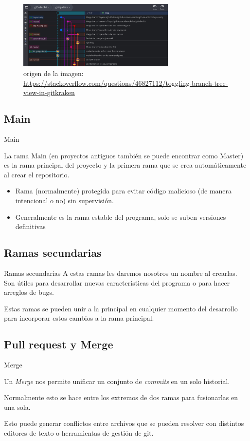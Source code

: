 \documentclass{beamer}
\begin{document}
\begin{frame}
    \begin{figure}[H]
        \includegraphics[width=0.7\textwidth]{../Images/ejemplo-ramas.png}
        \caption{origen de la imagen: \url{https://stackoverflow.com/questions/46827112/toggling-branch-tree-view-in-gitkraken}}
    \end{figure}
\end{frame}
\subsection{Main}
\begin{frame}{Main}
    
    La rama Main (en proyectos antiguos también se puede encontrar como Master) es la rama principal del proyecto y la primera rama que se crea automáticamente al crear el repositorio.

    \begin{itemize}
        \item Rama (normalmente) protegida para evitar código malicioso (de manera intencional o no) sin supervisión.
        \item Generalmente es la rama estable del programa, solo se suben versiones definitivas
    \end{itemize}

\end{frame}
\subsection{Ramas secundarias}
\begin{frame}{Ramas secundarias}
    A estas ramas les daremos nosotros un nombre al crearlas. Son útiles para desarrollar nuevas características del programa o para hacer arreglos de bugs.

    Estas ramas se pueden unir a la principal en cualquier momento del desarrollo para incorporar estos cambios a la rama principal.
\end{frame}
\subsection{Pull request y Merge}
\begin{frame}{Merge}
    
    Un \textit{Merge} nos permite unificar un conjunto de \textit{commits} en un solo historial. 
    
    Normalmente esto se hace entre los extremos de dos ramas para fusionarlas en una sola.

    Esto puede generar conflictos entre archivos que se pueden resolver con distintos editores de texto o herramientas de gestión de git.

\end{frame}
\end{document}
